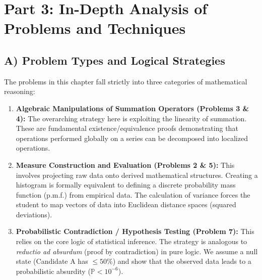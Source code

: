 \documentclass[11pt]{article}
\theoremstyle{definition}
\theoremstyle{remark}
\newcommand{\Prob}{\mathbb{P}}
\begin{document}
\section{Part 3: In-Depth Analysis of Problems and Techniques}

\subsection{A) Problem Types and Logical Strategies}
The problems in this chapter fall strictly into three categories of mathematical reasoning:
\begin{enumerate}
    \item \textbf{Algebraic Manipulations of Summation Operators (Problems 3 \& 4):} The overarching strategy here is exploiting the linearity of summation. These are fundamental existence/equivalence proofs demonstrating that operations performed globally on a series can be decomposed into localized operations. 
    \item \textbf{Measure Construction and Evaluation (Problems 2 \& 5):} This involves projecting raw data onto derived mathematical structures. Creating a histogram is formally equivalent to defining a discrete probability mass function (p.m.f.) from empirical data. The calculation of variance forces the student to map vectors of data into Euclidean distance spaces (squared deviations).
    \item \textbf{Probabilistic Contradiction / Hypothesis Testing (Problem 7):} This relies on the core logic of statistical inference. The strategy is analogous to \textit{reductio ad absurdum} (proof by contradiction) in pure logic. We assume a null state (Candidate A has $\le 50\%$) and show that the observed data leads to a probabilistic absurdity ($\Prob < 10^{-6}$).
\end{enumerate}
\end{document}
